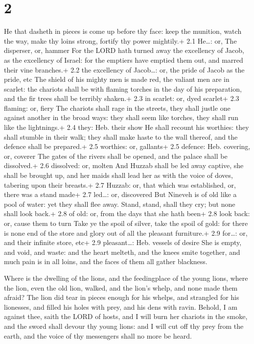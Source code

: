 \hypertarget{section-1}{%
\section{2}\label{section-1}}

 He that dasheth in pieces is come up before thy face: keep
the munition, watch the way, make thy loins strong, fortify thy power
mightily.+ 2.1 He\ldots: or, The disperser, or, hammer  For
the LORD hath turned away the excellency of Jacob, as the excellency of
Israel: for the emptiers have emptied them out, and marred their vine
branches.+ 2.2 the excellency of Jacob\ldots: or, the pride of Jacob as
the pride, etc  The shield of his mighty men is made red,
the valiant men are in scarlet: the chariots shall be with flaming
torches in the day of his preparation, and the fir trees shall be
terribly shaken.+ 2.3 in scarlet: or, dyed scarlet+ 2.3 flaming: or,
fiery  The chariots shall rage in the streets, they shall
justle one against another in the broad ways: they shall seem like
torches, they shall run like the lightnings.+ 2.4 they: Heb. their show
 He shall recount his worthies: they shall stumble in their
walk; they shall make haste to the wall thereof, and the defence shall
be prepared.+ 2.5 worthies: or, gallants+ 2.5 defence: Heb. covering,
or, coverer  The gates of the rivers shall be opened, and
the palace shall be dissolved.+ 2.6 dissolved: or, molten 
And Huzzab shall be led away captive, she shall be brought up, and her
maids shall lead her as with the voice of doves, tabering upon their
breasts.+ 2.7 Huzzab: or, that which was established, or, there was a
stand made+ 2.7 led\ldots: or, discovered  But Nineveh is of
old like a pool of water: yet they shall flee away. Stand, stand, shall
they cry; but none shall look back.+ 2.8 of old: or, from the days that
she hath been+ 2.8 look back: or, cause them to turn  Take
ye the spoil of silver, take the spoil of gold: for there is none end of
the store and glory out of all the pleasant furniture.+ 2.9 for\ldots:
or, and their infinite store, etc+ 2.9 pleasant\ldots: Heb. vessels of
desire  She is empty, and void, and waste: and the heart
melteth, and the knees smite together, and much pain is in all loins,
and the faces of them all gather blackness.

 Where is the dwelling of the lions, and the feedingplace
of the young lions, where the lion, even the old lion, walked, and the
lion's whelp, and none made them afraid?  The lion did tear
in pieces enough for his whelps, and strangled for his lionesses, and
filled his holes with prey, and his dens with ravin. 
Behold, I am against thee, saith the LORD of hosts, and I will burn her
chariots in the smoke, and the sword shall devour thy young lions: and I
will cut off thy prey from the earth, and the voice of thy messengers
shall no more be heard.

